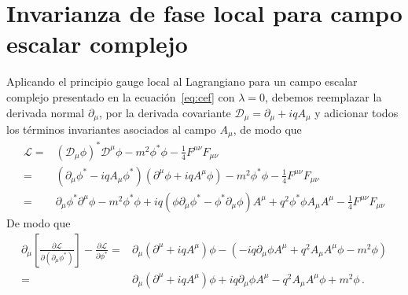 \section{Invarianza de fase local para campo escalar complejo}

Aplicando el principio gauge local al Lagrangiano para un campo escalar complejo presentado en la ecuación~\ref{eq:cef} con $\lambda=0$, debemos reemplazar la derivada normal $\partial_{\mu}$, por la derivada covariante $\mathcal{D}_{\mu}=\partial_{\mu}+iq A_{\mu}$ y adicionar todos los términos invariantes asociados al campo $A_\mu$, de modo que
\begin{align}
\label{eq:lcv}
  \mathcal{L}=& \left( \mathcal{D}_{\mu} \phi \right)^{*} \mathcal{D}^{\mu}\phi -m^2 \phi^{*}\phi-\frac{1}{4}F^{\mu\nu}F_{\mu\nu} \nonumber\\
             =&\left( \partial_{\mu}\phi^{*}-iq A_{\mu} \phi^{*} \right)\left( \partial^{\mu}\phi+iq A^{\mu} \phi \right) -m^2 \phi^{*}\phi-\frac{1}{4}F^{\mu\nu}F_{\mu\nu} \nonumber\\
              =&\partial_{\mu}\phi^{*}\partial^{\mu}\phi-m^2 \phi^{*}\phi+iq \left(\phi\partial_{\mu}\phi^{*} -\phi^{*}\partial_{\mu}\phi \right) A^{\mu} +q^2 \phi^{*}\phi A_{\mu} A^{\mu} -\frac{1}{4}F^{\mu\nu}F_{\mu\nu} 
\end{align}
De modo que
\begin{align}
  \partial_{\mu} \left[ \frac{\partial \mathcal{L}}{\partial \left( \partial_{\mu}\phi^{*} \right)} \right]-\frac{\partial \mathcal{L}}{\partial \phi^{*}}
=&\partial_{\mu} \left( \partial^{\mu}+iq A^{\mu} \right)\phi -\left(-iq \partial_{\mu}\phi A^{\mu} +q^2 A_{\mu}A^{\mu}\phi-m^{2}\phi  \right) \nonumber\\
 =&\partial_{\mu} \left( \partial^{\mu}+iq A^{\mu} \right)\phi  +iq \partial_{\mu}\phi A^{\mu}-q^2 A_{\mu}A^{\mu}\phi+m^{2}\phi\,.
\end{align}

